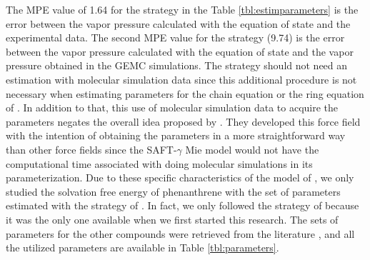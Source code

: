 The MPE value of 1.64 for the  strategy in the Table \ref{tbl:estimparameters} is the error between the vapor pressure calculated with the equation of state and the experimental data. The second MPE value for the  strategy (9.74) is the error between the vapor pressure calculated with the equation of state and the vapor pressure obtained in the GEMC simulations. The  strategy should not need an estimation with molecular simulation data since this additional procedure is not necessary when estimating parameters for the chain equation \cite{avendano2011} or the ring equation of . In addition to that, this use of molecular simulation data to acquire the parameters negates the overall idea proposed by \cite{avendano2011}. They developed this force field with the intention of obtaining the parameters in a more straightforward way than other force fields since the SAFT-$\gamma$ Mie model would not have the computational time associated with doing molecular simulations in its parameterization. Due to these specific characteristics of the model of , we only studied the solvation free energy of phenanthrene with the set of parameters estimated with the strategy of . In fact, we only followed the strategy of  because it was the only one available when we first started this research. The sets of parameters for the other compounds were retrieved from the literature \cite{lobanova2016,herdes2015,ervik2016,muller2017}, and all the utilized parameters are available in Table \ref{tbl:parameters}.

